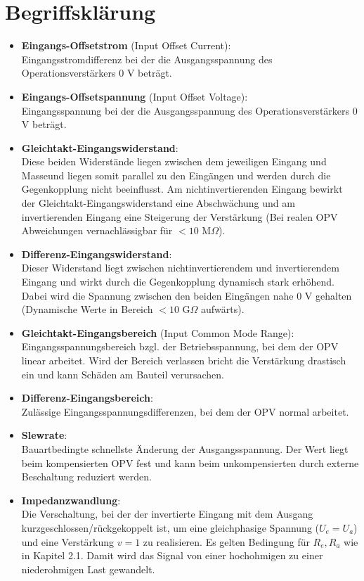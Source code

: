 \section{Begriffsklärung}
\label{sec:begriffe}
\begin{itemize}
    \item \textbf{Eingangs-Offsetstrom} (Input Offset Current):\\ Eingangsstromdifferenz bei der die Ausgangsspannung des Operationsverstärkers 0 V beträgt. %
    \item \textbf{Eingangs-Offsetspannung} (Input Offset Voltage):\\ Eingangsspannung bei der die Ausgangsspannung des Operationsverstärkers 0 V beträgt. %
    \item \textbf{Gleichtakt-Eingangswiderstand}:\\ Diese beiden Widerstände liegen zwischen dem jeweiligen Eingang und Masseund liegen somit parallel zu den Eingängen und werden durch die Gegenkopplung nicht beeinflusst. Am nichtinvertierenden Eingang bewirkt der Gleichtakt-Eingangswiderstand eine Abschwächung und am invertierenden Eingang eine Steigerung der Verstärkung (Bei realen OPV Abweichungen vernachlässigbar für $<10$ M$\Omega$). %
    \item \textbf{Differenz-Eingangswiderstand}:\\ Dieser Widerstand liegt zwischen nichtinvertierendem und invertierendem Eingang und wirkt durch die Gegenkopplung dynamisch stark erhöhend. Dabei wird die Spannung zwischen den beiden Eingängen nahe 0 V gehalten (Dynamische Werte in Bereich $<10$ G$\Omega$ aufwärts). %
    \item \textbf{Gleichtakt-Eingangsbereich} (Input Common Mode Range):\\ Eingangsspannungsbereich bzgl. der Betriebsspannung, bei dem der OPV linear arbeitet. Wird der Bereich verlassen bricht die Verstärkung drastisch ein und kann Schäden am Bauteil verursachen. 
    \item \textbf{Differenz-Eingangsbereich}:\\ Zulässige Eingangsspannungsdifferenzen, bei dem der OPV normal arbeitet.
    \item \textbf{Slewrate}:\\ Bauartbedingte schnellste Änderung der Ausgangsspannung. Der Wert liegt beim kompensierten OPV fest und kann beim unkompensierten durch externe Beschaltung reduziert werden. %
    \item \textbf{Impedanzwandlung}:\\ Die Verschaltung, bei der der invertierte Eingang mit dem Ausgang kurzgeschlossen/rückgekoppelt ist, um eine gleichphasige Spannung ($U_e=U_a$) und eine Verstärkung $v=1$ zu realisieren. Es gelten Bedingung für $R_e, R_a$ wie in Kapitel 2.1. Damit wird das Signal von einer hochohmigen zu einer niederohmigen Last gewandelt. 
\end{itemize}

